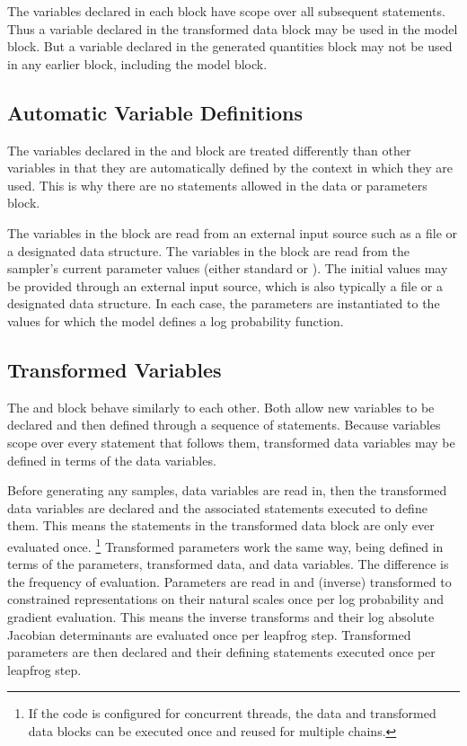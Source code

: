 The variables declared in each block have scope over all subsequent
statements.  Thus a variable declared in the transformed data block
may be used in the model block.  But a variable declared in the
generated quantities block may not be used in any earlier block,
including the model block.

\subsection{Automatic Variable Definitions}

The variables declared in the  and  block
are treated differently than other variables in that they are
automatically defined by the context in which they are used.  This is
why there are no statements allowed in the data or parameters block.

The variables in the  block are read from an external input
source such as a file or a designated \R data structure.  The
variables in the  block are read from the sampler's
current parameter values (either standard \HMC or \NUTS).  The initial
values may be provided through an external input source, which is also
typically a file or a designated \R data structure.  In each case, the
parameters are instantiated to the values for which the model defines
a log probability function.

\subsection{Transformed Variables}

The  and  block
behave similarly to each other.  Both allow new variables to be
declared and then defined through a sequence of statements.  Because
variables scope over every statement that follows them, transformed
data variables may be defined in terms of the data variables.

Before generating any samples, data variables are read in, then the
transformed data variables are declared and the associated statements
executed to define them.  This means the statements in the transformed
data block are only ever evaluated once.%
%
\footnote{If the \Cpp code is configured for concurrent threads, the
  data and transformed data blocks can be executed once and reused for
  multiple chains.}
%
Transformed parameters work the same way, being defined in terms of
the parameters, transformed data, and data variables.  The difference
is the frequency of evaluation.  Parameters are read in and (inverse)
transformed to constrained representations on their natural scales
once per log probability and gradient evaluation.  This means the
inverse transforms and their log absolute Jacobian determinants are
evaluated once per leapfrog step.  Transformed parameters are then
declared and their defining statements executed once per leapfrog
step.

